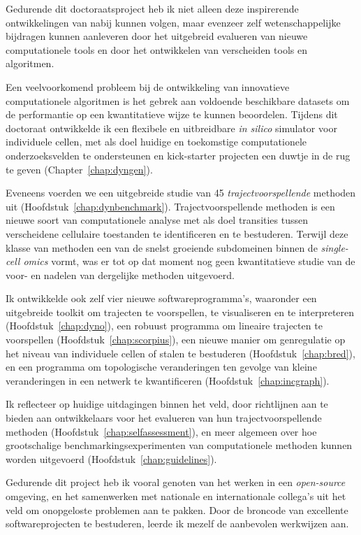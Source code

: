 Gedurende dit doctoraatsproject heb ik niet alleen deze inspirerende ontwikkelingen van nabij kunnen volgen, maar evenzeer zelf wetenschappelijke bijdragen kunnen aanleveren door het uitgebreid evalueren van nieuwe computationele tools en door het ontwikkelen van verscheiden tools en algoritmen.

Een veelvoorkomend probleem bij de ontwikkeling van innovatieve computationele algoritmen is het gebrek aan voldoende beschikbare datasets om de performantie op een kwantitatieve wijze te kunnen beoordelen. Tijdens dit doctoraat ontwikkelde ik een flexibele en uitbreidbare \textit{in silico} simulator voor individuele cellen, met als doel huidige en toekomstige computationele onderzoeksvelden te ondersteunen en kick-starter projecten een duwtje in de rug te geven (Chapter~\ref{chap:dyngen}). 

Eveneens voerden we een uitgebreide studie van 45 \textit{trajectvoorspellende} methoden uit (Hoofdstuk~\ref{chap:dynbenchmark}). Trajectvoorspellende methoden is een nieuwe soort van computationele analyse met als doel transities tussen verscheidene cellulaire toestanden te identificeren en te bestuderen. Terwijl deze klasse van methoden een van de snelst groeiende subdomeinen binnen de \textit{single-cell omics} vormt, was er tot op dat moment nog geen kwantitatieve studie van de voor- en nadelen van dergelijke methoden uitgevoerd.

Ik ontwikkelde ook zelf vier nieuwe softwareprogramma's, waaronder een uitgebreide toolkit om trajecten te voorspellen, te visualiseren en te interpreteren (Hoofdstuk~\ref{chap:dyno}), een robuust programma om lineaire trajecten te voorspellen (Hoofdstuk~\ref{chap:scorpius}), een nieuwe manier om genregulatie op het niveau van individuele cellen of stalen te bestuderen (Hoofdstuk~\ref{chap:bred}), en een programma om topologische veranderingen ten gevolge van kleine veranderingen in een netwerk te kwantificeren (Hoofdstuk~\ref{chap:incgraph}). 

Ik reflecteer op huidige uitdagingen binnen het veld, door richtlijnen aan te bieden aan ontwikkelaars voor het evalueren van hun trajectvoorspellende methoden (Hoofdstuk~\ref{chap:selfassessment}), en meer algemeen over hoe grootschalige benchmarkingsexperimenten van computationele methoden kunnen worden uitgevoerd (Hoofdstuk~\ref{chap:guidelines}).

Gedurende dit project heb ik vooral genoten van het werken in een \textit{open-source} omgeving, en het samenwerken met nationale en internationale collega’s uit het veld om onopgeloste problemen aan te pakken.  Door de broncode van excellente softwareprojecten te bestuderen, leerde ik mezelf de aanbevolen werkwijzen aan.